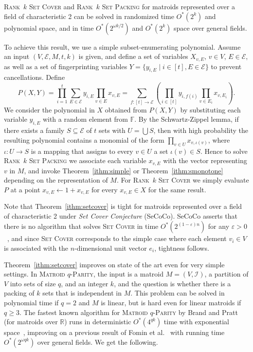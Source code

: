 \documentclass{theoretics}
\newcommand{\cI}{\ensuremath{\mathcal I}\xspace}
\newcommand{\cE}{\ensuremath{\mathcal E}\xspace}
\begin{document}
\begin{theorem} \label{ithm:setcover}
  \textsc{Rank~$k$ Set Cover} and \textsc{Rank~$k$ Set Packing} for
  matroids represented over a field of characteristic 2 can be solved
  in randomized time $O^*(2^k)$ and polynomial space,
  and in time $O^*(2^{\omega k / 2})$ and $O^*(2^k)$ space over general fields.
\end{theorem}

To achieve this result, we use a simple subset-enumerating polynomial.
Assume an input $(V,\cE,M,t,k)$ is given, and define a set of
variables $X_{v,E}$, $v \in V$, $E \in \cE$, as well as a set of
fingerprinting variables $Y=\{y_{i,E} \mid i \in [t], E \in \cE\}$
to prevent cancellations. Define
\[
  P(X,Y) = \prod_{i=1}^t \sum_{E \in \cE} y_{i,E} \prod_{v \in E} x_{v,E}
  = \sum_{f \colon [t] \to \cE} \left( \prod_{i \in [t]} y_{i,f(i)} \prod_{v\in E_i} x_{v,E_i} \right).
\]
We consider the polynomial in $X$ obtained from $P(X,Y)$ by substituting each variable $y_{i,E}$ with a random element from $\mathbb{F}$.
By the Schwartz-Zippel lemma, if there exists a family $S \subseteq \mathcal{E}$ of $t$ sets with $U = \bigcup S$, then with high probability the resulting polynomial contains a monomial of the form $\prod_{v \in U} x_{v,\iota(v)}$, where $\iota \colon U \to S$ is a mapping that assigns to every $v \in U$ a set $\iota(v) \in S$.
Hence to solve \textsc{Rank~$k$ Set Packing}
we associate each variable $x_{v,E}$ with the vector representing $v$
in $M$, and invoke Theorem~\ref{ithm:simple} or Theorem~\ref{ithm:smonotone}
depending on the representation of $M$. 
For \textsc{Rank~$k$ Set Cover} we simply evaluate $P$ at a point
$x_{v,E} \gets 1+x_{v,E}$ for every $x_{v,E} \in X$ for the same result.

Note that Theorem~\ref{ithm:setcover} is tight for matroids
represented over a field of characteristic 2 under \emph{Set Cover
  Conjecture} (SeCoCo).
SeCoCo asserts that there is
no algorithm that solves \textsc{Set Cover} in time $O^*(2^{(1-\varepsilon)n})$
for any $\varepsilon > 0$~\cite{CyganDLMNOPSW16seth}, and since
\textsc{Set Cover} corresponds to the simple case where each element
$v_i \in V$ is associated with the $n$-dimensional unit vector $e_i$,
tightness follows.

Theorem~\ref{ithm:setcover} improves on state of the art even for very
simple settings. In \textsc{Matroid $q$-Parity}, the input is a
matroid $M=(V,\cI)$, a partition of $V$ into sets of size $q$, 
and an integer $k$, and the question is whether there is a packing
of $k$ sets that is independent in $M$. This problem can be solved in
polynomial time if $q=2$ and $M$ is linear, but is hard even for
linear matroids if $q \geq 3$. The fastest known algorithm for
\textsc{Matroid $q$-Parity} by Brand and Pratt
(for matroids over $\mathbb{R}$)
runs in deterministic $O^*(4^{qk})$ time
with exponential space~\cite{BrandP21},
improving on a previous result of Fomin et al.~\cite{FominLPS16JACM}
with running time $O^*(2^{\omega q k})$
over general fields.
We get the following. 
\end{document}

